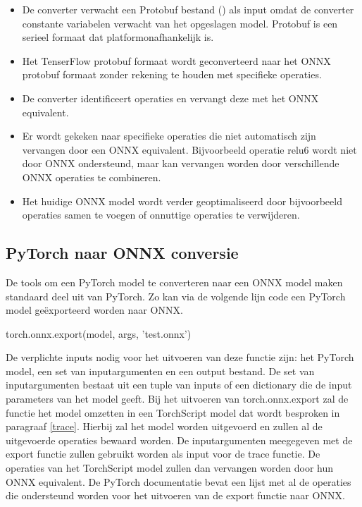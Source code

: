 \begin{itemize}
	\item De converter verwacht een Protobuf bestand (\cite{Google_protocol_2014}) als input omdat de converter constante variabelen verwacht van het opgeslagen model. Protobuf is een serieel formaat dat platformonafhankelijk is.
	\item Het TenserFlow protobuf formaat wordt geconverteerd naar het ONNX protobuf formaat zonder rekening te houden met specifieke operaties.
	\item De converter identificeert operaties en vervangt deze met het ONNX equivalent.
	\item Er wordt gekeken naar specifieke operaties die niet automatisch zijn vervangen door een ONNX equivalent. Bijvoorbeeld operatie relu6 wordt niet door ONNX ondersteund, maar kan vervangen worden door verschillende ONNX operaties te combineren.
	\item Het huidige ONNX model wordt verder geoptimaliseerd door bijvoorbeeld operaties samen te voegen of onnuttige operaties te verwijderen.
\end{itemize}

\subsection{PyTorch naar ONNX conversie}
De tools om een PyTorch model te converteren naar een ONNX model maken standaard deel uit van PyTorch.
Zo kan via de volgende lijn code een PyTorch model ge\"exporteerd worden naar ONNX.

\begin{python}
torch.onnx.export(model, args, 'test.onnx')
\end{python}

De verplichte inputs nodig voor het uitvoeren van deze functie zijn: het PyTorch model, een set van inputargumenten en een output bestand.
De set van inputargumenten bestaat uit een tuple van inputs of een dictionary die de input parameters van het model geeft.
Bij het uitvoeren van torch.onnx.export zal de functie het model omzetten in een TorchScript model dat wordt besproken in paragraaf \ref{trace}.
Hierbij zal het model worden uitgevoerd en zullen al de uitgevoerde operaties bewaard worden.
De inputargumenten meegegeven met de export functie zullen gebruikt worden als input voor de trace functie.
De operaties van het TorchScript model zullen dan vervangen worden door hun ONNX equivalent.
De PyTorch documentatie bevat een lijst met al de operaties die ondersteund worden voor het uitvoeren van de export functie naar ONNX.

